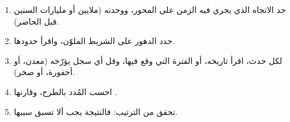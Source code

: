 \begin{method}\label{met:g12:early-earth:timeline}
\begin{enumerate}
  \item جد الاتجاه الذي يجري فيه الزمن على المحور، ووحدته (ملايين أو
        مليارات السنين قبل الحاضر).
  \item حدد الدهور على الشريط الملوّن، واقرأ حدودها.
  \item لكل حدث، اقرأ تاريخه، أو الفترة التي
        وقع فيها، وقل أي سجل يؤرّخه (معدن، أو أحفورة، أو صخر).
  \item احسب المُدد بالطرح، وقارنها .
  \item تحقق من الترتيب: فالنتيجة يجب ألا تسبق سببها.
\end{enumerate}
\end{method}

